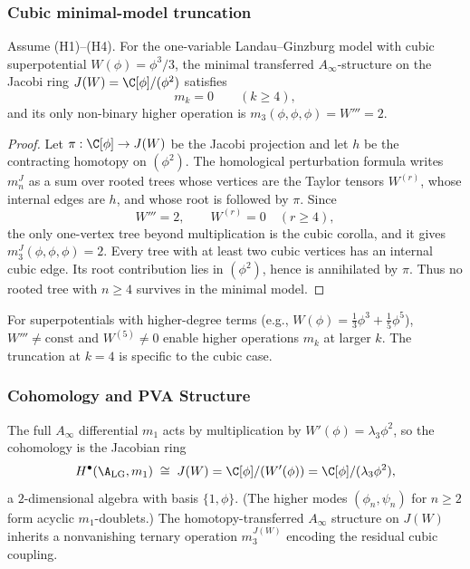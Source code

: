 \subsubsection{Cubic minimal-model truncation}

\begin{theorem}
Assume \textrm{(H1)--(H4)}.
For the one-variable Landau--Ginzburg model with cubic superpotential
$W(\phi)=\phi^3/3$, the minimal transferred \(A_\infty\)-structure on
the Jacobi ring \(J(W)=\C[\phi]/(\phi^2)\) satisfies
\begin{equation}
m_k=0\qquad(k\geq4),
\end{equation}
and its only non-binary higher operation is
\(m_3(\phi,\phi,\phi)=W'''=2\).
\end{theorem}

\begin{proof}
Let \(\pi:\C[\phi]\to J(W)\) be the Jacobi projection and let \(h\)
be the contracting homotopy on \((\phi^2)\). The homological
perturbation formula writes \(m_n^J\) as a sum over rooted trees whose
vertices are the Taylor tensors \(W^{(r)}\), whose internal edges are
\(h\), and whose root is followed by \(\pi\). Since
\[
W'''=2,\qquad W^{(r)}=0\quad(r\geq4),
\]
the only one-vertex tree beyond multiplication is the cubic corolla,
and it gives \(m_3^J(\phi,\phi,\phi)=2\). Every tree with at least two
cubic vertices has an internal cubic edge. Its root contribution lies
in \((\phi^2)\), hence is annihilated by \(\pi\). Thus no rooted tree
with \(n\geq4\) survives in the minimal model.
\end{proof}

\begin{remark}
For superpotentials with higher-degree terms (e.g., $W(\phi) = \frac{1}{3}\phi^3 + \frac{1}{5}\phi^5$), $W''' \neq \text{const}$ and $W^{(5)} \neq 0$ enable higher operations $m_k$ at larger $k$. The truncation at $k=4$ is specific to the cubic case.
\end{remark}

\subsubsection{Cohomology and PVA Structure}

\begin{proposition}
The full $A_\infty$ differential $m_1$ acts by multiplication by $W'(\phi) = \lambda_3 \phi^2$, so
the cohomology is the Jacobian ring
\begin{equation}
H^\bullet(\A_{\text{LG}}, m_1) \;\cong\; J(W) = \C[\phi]/(W'(\phi)) = \C[\phi]/(\lambda_3 \phi^2),
\end{equation}
a $2$-dimensional algebra with basis $\{1, \phi\}$.
(The higher modes $(\phi_n, \psi_n)$ for $n \geq 2$ form acyclic $m_1$-doublets.)
The homotopy-transferred $A_\infty$ structure on $J(W)$ inherits a nonvanishing ternary
operation $m_3^{J(W)}$ encoding the residual cubic coupling.
\end{proposition}

